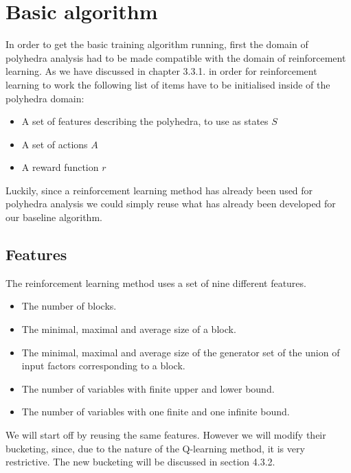 \section{Basic algorithm}
In order to get the basic training algorithm running, first the domain of polyhedra analysis had to be made compatible with the domain of reinforcement learning. As we have discussed in chapter 3.3.1. in order for reinforcement learning to work the following list of items have to be initialised inside of the polyhedra domain:
\begin{itemize}
	\item A set of features describing the polyhedra, to use as states $S$
	\item A set of actions $A$
	\item A reward function $r$
\end{itemize}
Luckily, since a reinforcement learning method \cite{singh2018fast} has already been used for polyhedra analysis we could simply reuse what has already been developed for our baseline algorithm.\\
\subsection{Features}
The reinforcement learning method uses a set of nine different features.
\begin{itemize}
	\item The number of blocks.
	\item The minimal, maximal and average size of a block.
	\item The minimal, maximal and average size of the generator set of the union of input factors corresponding to a block.
	\item The number of variables with finite upper and lower bound.
	\item The number of variables with one finite and one infinite bound.
\end{itemize}
We will start off by reusing the same features. However we will modify their bucketing, since, due to the nature of the Q-learning method, it is very restrictive. The new bucketing will be discussed in section 4.3.2.

